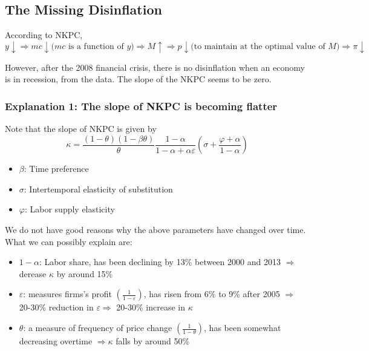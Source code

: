 \documentclass{article}
\begin{document}
\subsection{The Missing Disinflation}
\noindent According to NKPC, \\
$$y\downarrow \Rightarrow mc\downarrow \text{($mc$ is a function of $y$)}\Rightarrow M\uparrow \Rightarrow p\downarrow \text{(to maintain at the optimal value of $M$)} \Rightarrow \pi \downarrow$$

\noindent However, after the 2008 financial crisis, there is no disinflation when an economy is in recession, from the data. The slope of the NKPC seems to be zero.

\subsubsection{Explanation 1: The slope of NKPC is becoming flatter}
Note that the slope of NKPC is given by
$$\kappa = \frac{(1-\theta)(1-\beta\theta)}{\theta}\frac{1-\alpha}{1-\alpha + \alpha \varepsilon}\left(\sigma + \frac{\varphi + \alpha}{1-\alpha}\right)$$

\begin{itemize}
    \item $\beta$: Time preference
    \item $\sigma$: Intertemporal elasticity of substitution
    \item $\varphi$: Labor supply elasticity
\end{itemize}

\noindent We do not have good reasons why the above parameters have changed over time. What we can possibly explain are:

\begin{itemize}
    \item $1-\alpha$: Labor share, has been declining by 13\% between 2000 and 2013 $\Rightarrow$ derease $\kappa$ by around 15\%
    \item $\varepsilon$: measures firms's profit $\left(\frac{1}{1-\varepsilon}\right)$, has risen from 6\% to 9\% after 2005 $\Rightarrow$ 20-30\% reduction in $\varepsilon \Rightarrow$ 20-30\% increase in $\kappa$
    \item $\theta$: a measure of frequency of price change $\left(\frac{1}{1-\theta}\right)$, has been somewhat decreasing overtime $\Rightarrow\kappa$ falls by around 50\% 
\end{itemize}
\end{document}
